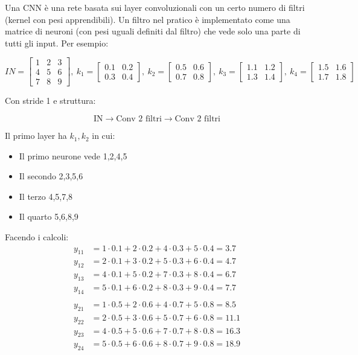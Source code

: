 \documentclass{article}
\begin{document}
Una CNN è una rete basata sui layer convoluzionali con un certo numero di filtri (kernel con pesi apprendibili). Un filtro nel pratico è implementato come una matrice di neuroni (con pesi uguali definiti dal filtro) che vede solo una parte di tutti gli input. Per esempio:

$$
IN=\begin{bmatrix}
    1 & 2 & 3\\
    4 & 5 & 6\\
    7 & 8 & 9
\end{bmatrix}
,\ k_1=\begin{bmatrix}
    0.1 & 0.2 \\
    0.3 & 0.4 
\end{bmatrix}
,\ k_2=\begin{bmatrix}
    0.5 & 0.6 \\
    0.7 & 0.8
\end{bmatrix}
,\ k_3=\begin{bmatrix}
    1.1 & 1.2 \\
    1.3 & 1.4
\end{bmatrix}
,\ k_4=\begin{bmatrix}
    1.5 & 1.6 \\
    1.7 & 1.8
\end{bmatrix}
$$\newline

Con stride 1 e struttura:

$$\text{IN}\rightarrow\text{Conv 2 filtri}\rightarrow\text{Conv 2 filtri}$$\newline

Il primo layer ha $k_1,k_2$ in cui:
\begin{itemize}
    \item Il primo neurone vede 1,2,4,5
    \item Il secondo 2,3,5,6
    \item Il terzo 4,5,7,8
    \item Il quarto 5,6,8,9\newline
\end{itemize}

Facendo i calcoli:
\[
\begin{aligned}
y_{11}&=1\cdot0.1+2\cdot0.2+4\cdot0.3+5\cdot0.4=3.7\\
y_{12}&=2\cdot0.1+3\cdot0.2+5\cdot0.3+6\cdot0.4=4.7\\
y_{13}&=4\cdot0.1+5\cdot0.2+7\cdot0.3+8\cdot0.4=6.7\\
y_{14}&=5\cdot0.1+6\cdot0.2+8\cdot0.3+9\cdot0.4=7.7\\
\\
y_{21}&=1\cdot0.5+2\cdot0.6+4\cdot0.7+5\cdot0.8=8.5\\
y_{22}&=2\cdot0.5+3\cdot0.6+5\cdot0.7+6\cdot0.8=11.1\\
y_{23}&=4\cdot0.5+5\cdot0.6+7\cdot0.7+8\cdot0.8=16.3\\
y_{24}&=5\cdot0.5+6\cdot0.6+8\cdot0.7+9\cdot0.8=18.9
\end{aligned}
\]\newline
\end{document}
